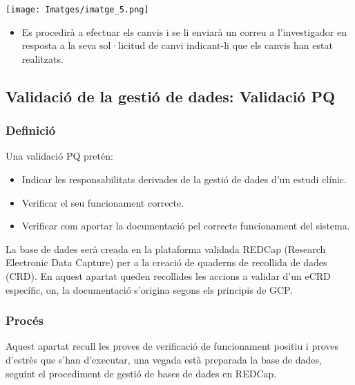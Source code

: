 \documentclass[
]{article}
\providecommand{\tightlist}{%
  \setlength{\itemsep}{0pt}\setlength{\parskip}{0pt}}
\begin{document}
\texttt{[image: Imatges/imatge\_5.png]}

\begin{itemize}
\tightlist
\item
  Es procedirà a efectuar els canvis i se li enviarà un correu a l'investigador en resposta a la seva sol·licitud de canvi indicant-li que els canvis han estat realitzats.
\end{itemize}

\hypertarget{en16}{%
\subsection{\texorpdfstring{\textbf{Validació de la gestió de dades: Validació PQ}}{Validació de la gestió de dades: Validació PQ}}\label{en16}}

\hypertarget{definiciuxf3}{%
\subsubsection{\texorpdfstring{\textbf{Definició}}{Definició}}\label{definiciuxf3}}

Una validació PQ pretén:

\begin{itemize}
\tightlist
\item
  Indicar les responsabilitats derivades de la gestió de dades d'un estudi clínic.
\item
  Verificar el seu funcionament correcte.
\item
  Verificar com aportar la documentació pel correcte funcionament del sistema.
\end{itemize}

La base de dades serà creada en la plataforma validada REDCap (Research Electronic Data Capture) per a la creació de quaderns de recollida de dades (CRD). En aquest apartat queden recollides les accions a validar d'un eCRD específic, on, la documentació s'origina segons els principis de GCP.

\hypertarget{procuxe9s}{%
\subsubsection{\texorpdfstring{\textbf{Procés}}{Procés}}\label{procuxe9s}}

Aquest apartat recull les proves de verificació de funcionament positiu i proves d'estrès que s'han d'executar, una vegada està preparada la base de dades, seguint el procediment de gestió de bases de dades en REDCap.
\end{document}
